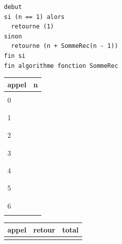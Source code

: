 \documentclass[11pt,a4paper]{article}
\begin{document}
\begin{table}[h!]
\begin{minipage}{0.5\textwidth}
\begin{lstlisting}[style=algorithmique]
debut
si (n == 1) alors
  retourne (1)
sinon
  retourne (n + SommeRec(n - 1))
fin si
fin algorithme fonction SommeRec \end{lstlisting}
  \end{minipage}
  \hfillx
  \begin{minipage}{0.13\textwidth}
    \centering
    \begin{tabular}{|C{1cm}|C{1cm}|}
        \hline
        appel &  n  \\
        \hline
              &     \\
        0     &     \\
              &     \\
        \hline
              &     \\
        1     &     \\
              &     \\
        \hline
              &     \\
        2     &     \\
              &     \\
        \hline
              &     \\
        3     &     \\
              &     \\
        \hline
              &     \\
        4     &     \\
              &     \\
        \hline
              &     \\
        5     &     \\
              &     \\
        \hline
              &     \\
        6     &     \\
              &     \\
        \hline
    \end{tabular}
  \end{minipage}
  \hfillx
  \begin{minipage}{0.24\textwidth}
    \centering
    \begin{tabular}{|C{1cm}|C{1cm}|C{1cm}|}
        \hline
        appel & retour & total \\
        \hline
              &        & \\

\end{tabular}
\end{minipage}
\end{table}
\end{document}

